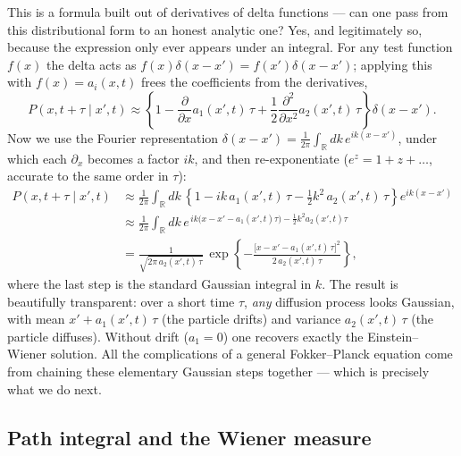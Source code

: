 This is a formula built out of derivatives of delta functions --- can one pass from this distributional form to an honest analytic one?
Yes, and legitimately so, because the expression only ever appears under an integral.
For any test function $f(x)$ the delta acts as $f(x)\delta(x-x')=f(x')\delta(x-x')$; applying this with $f(x)=a_i(x,t)$ frees the coefficients from the derivatives,
\begin{equation}
P(x,t+\tau\mid x',t) \approx \left\{1 - \frac{\partial}{\partial x}a_1(x',t)\,\tau + \frac{1}{2}\frac{\partial^2}{\partial x^2}a_2(x',t)\,\tau\right\}\delta(x-x').
\end{equation}
Now we use the Fourier representation $\delta(x-x')=\frac{1}{2\pi}\int_{\mathbb{R}} dk\, e^{ik(x-x')}$, under which each $\partial_x$ becomes a factor $ik$, and then re-exponentiate ($e^{z}=1+z+\dots$, accurate to the same order in $\tau$):
\begin{equation}
\begin{aligned}
P(x,t+\tau\mid x',t)
&\approx \frac{1}{2\pi}\int_{\mathbb{R}} dk\, \left\{1 - i k\,a_1(x',t)\,\tau - \tfrac{1}{2}k^2\,a_2(x',t)\,\tau\right\} e^{ik(x-x')}\\
&\approx \frac{1}{2\pi}\int_{\mathbb{R}} dk\, e^{\,ik\big(x-x'-a_1(x',t)\tau\big) - \frac{1}{2}k^2 a_2(x',t)\tau}\\
&= \frac{1}{\sqrt{2\pi\,a_2(x',t)\,\tau}}\,\exp\!\left\{-\frac{\big[x-x'-a_1(x',t)\,\tau\big]^2}{2\,a_2(x',t)\,\tau}\right\},
\end{aligned}
\end{equation}
where the last step is the standard Gaussian integral in $k$.
The result is beautifully transparent: over a short time $\tau$, \emph{any} diffusion process looks Gaussian, with mean $x'+a_1(x',t)\,\tau$ (the particle drifts) and variance $a_2(x',t)\,\tau$ (the particle diffuses).
Without drift ($a_1=0$) one recovers exactly the Einstein--Wiener solution.
All the complications of a general Fokker--Planck equation come from chaining these elementary Gaussian steps together --- which is precisely what we do next.

\subsection{Path integral and the Wiener measure}

